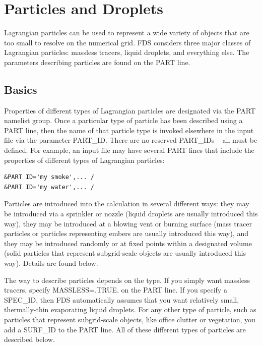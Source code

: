 \documentclass[11pt]{book}
\begin{document}
\chapter{Particles and Droplets}
\label{info:PART}


Lagrangian particles can be used to represent a wide variety of objects that are too small to resolve on the numerical grid. FDS considers three major classes of Lagrangian particles: massless tracers, liquid droplets, and everything else. The parameters describing particles are found on the {\ct PART} line.



\section{Basics}
\label{info:PART_Basics}

Properties of different types of
Lagrangian particles are designated via the {\ct PART} namelist group.
Once a particular type of particle has been described using
a {\ct PART} line, then the name of that particle type is invoked
elsewhere in the input file via the parameter {\ct PART\_ID}. There are no reserved {\ct PART\_ID}s -- all must be defined.
For example, an input file may have several {\ct PART} lines that include the
properties of different types of Lagrangian particles:
\begin{lstlisting}
&PART ID='my smoke',... /
&PART ID='my water',... /
\end{lstlisting}
Particles are introduced into the calculation in several different ways: they may be introduced via a sprinkler or nozzle (liquid droplets are usually introduced this way), they may be introduced at a blowing vent or burning surface (mass tracer particles or particles representing embers are usually introduced this way), and they may be introduced randomly or at fixed points within a designated volume (solid particles that represent subgrid-scale objects are usually introduced this way). Details are found below.

The way to describe particles depends on the type.
If you simply want massless tracers, specify {\ct MASSLESS=.TRUE.} on the {\ct PART} line. If you specify a {\ct SPEC\_ID}, then FDS automatically assumes that you want relatively small, thermally-thin evaporating liquid droplets. For any other type of particle, such as particles that represent subgrid-scale objects, like office clutter or vegetation, you add a {\ct SURF\_ID} to the {\ct PART} line. All of these different types of particles are described below.
\end{document}
